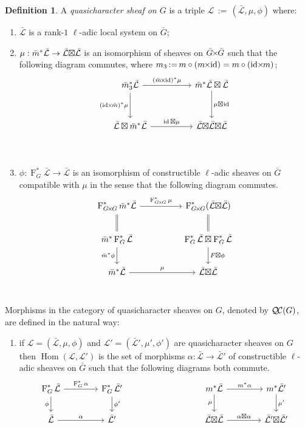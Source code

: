 \documentclass[11pt]{amsart}
\makeatletter
\theoremstyle{plain}
\theoremstyle{definition}
\newtheorem{definition}[theorem]{Definition}
\theoremstyle{remark}
\newcommand{\Frob}[1]{\operatorname{F}_{#1}}
\DeclareMathOperator{\Hom}{Hom}
\DeclareMathOperator{\id}{id}
\newcommand{\ceq}{{\, :=\, }}
\newcommand{\cs}[1]{{\mathcal{#1}}}
\newcommand{\gcs}[1]{{\mathcal{\bar #1}}}
\newcommand{\QC}{{\mathcal{Q\hskip-0.8pt C}}}
\newcommand{\labitem}[2]{%
\def\@itemlabel{\textbf{#1}}
\item
\def\@currentlabel{#1}\label{#2}}
\newcommand{\bm}{\bar{m}}
\newcommand{\bG}{\bar{G}}
\newcommand{\tight}[3]{\hspace{-#1pt}{#2}\hspace{-#3pt}}
\newcommand{\bGxG}{\text{$\bar{G} \tight{1}{\times}{1} \bar{G}$}}
\newcommand{\GxxG}{\text{$G \tight{1}{\times}{1} G$}}
\newcommand{\LxL}{\text{$\gcs{L} \tight{0}{\boxtimes}{0} \gcs{L}$}}
\makeatother
\begin{document}
\begin{definition}\label{def:QC}
A \emph{quasicharacter sheaf on $G$} is a triple
$\cs{L}\ceq (\gcs{L},\mu,\phi)$ where:
\begin{enumerate}
\labitem{(CS.0)}{CS.0} $\gcs{L}$ is a rank-$1$ $\ell$-adic local system on $\bG$;
\labitem{(CS.1)}{CS.1} $\mu: \bm^* \gcs{L} \to \LxL$
  is an isomorphism of sheaves on $\bGxG$ such that the following diagram commutes, 
  where $m_3 \ceq m\circ (m\tight{1}{\times}{2}\id) = m\circ (\id\tight{2}{\times}{1} m)$;
%
  \[
  \begin{tikzcd}[row sep=30]
  \bm_3^*\gcs{L} \arrow{rr}{(\bm \tight{1}{\times}{2} \id)^*\mu} \arrow[swap]{d}{(\id \tight{2}{\times}{1} \bm)^*\mu}
    &&  \bm^*\gcs{L} \boxtimes \gcs{L} \dar{\mu \tight{0}{\boxtimes}{1} \id} \\
    \gcs{L} \boxtimes \bm^* \gcs{L} \arrow{rr}{\id \boxtimes \mu}
    &&  \gcs{L} \tight{0}{\boxtimes}{0} \LxL\\
  \end{tikzcd}
  \]
  
%
\labitem{(CS.2)}{CS.2} $\phi : \Frob{G}^* \gcs{L} \to \gcs{L}$ is an
  isomorphism of constructible $\ell$-adic sheaves on $\bG$ compatible with $\mu$ in the sense that the following diagram commutes.
%
  \[
  \begin{tikzcd}[row sep=20]
  \Frob{\GxxG}^* \bm^* \gcs{L} \arrow{rr}{\Frob{\GxxG}^*\mu}
    && \Frob{\GxxG}^*(\LxL)\\
    \arrow[equal]{u} \bm^*  \Frob{G}^* \gcs{L} \arrow[swap]{d}{\bm^* \phi}
    && \Frob{G}^*\gcs{L}\boxtimes \Frob{G}^*\gcs{L} \dar{F\boxtimes \phi} \arrow[equal]{u} \\
    \bm^*\gcs{L} \arrow{rr}{\mu}
    && \LxL\\
  \end{tikzcd}
  \]
\end{enumerate}
\end{definition}

Morphisms in the category of quasicharacter sheaves on $G$, denoted by $\QC(G)$, are defined in the natural way:
\begin{enumerate}
\labitem{(CS.3)}{CS.3} if $\cs{L} = (\gcs{L},\mu,\phi)$ and
  $\cs{L'} = (\gcs{L'},\mu',\phi')$ are quasicharacter sheaves on $G$ then
  $\Hom(\cs{L},\cs{L'})$ is the set of morphisms $\alpha : \gcs{L} \to \gcs{L'}$
  of constructible $\ell$-adic sheaves on $\bG$ such that the following diagrams both commute.
  \[
  \begin{tikzcd}[column sep=40]
  \Frob{G}^* \gcs{L} \rar{\Frob{G}^* \alpha} \arrow[swap]{d}{\phi} & \Frob{G}^* \gcs{L'} \dar{\phi'}
  & %
  & \arrow[swap]{d}{\mu} m^* \gcs{L} \rar{m^* \alpha} & m^* \gcs{L'} \dar{\mu'} \\
  \gcs{L} \rar{\alpha} & \gcs{L'}
  & {} & \LxL \rar{\tight{1}{\alpha\boxtimes \alpha}{1}} & \gcs{L'} \tight{0}{\boxtimes}{0} \gcs{L'}
  \end{tikzcd}
  \]
\end{enumerate}
\end{document}
